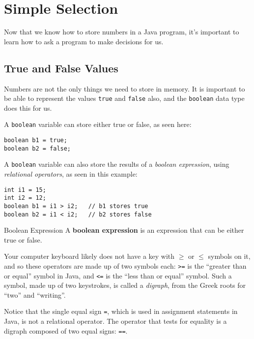 
\chapter{Simple Selection}
\label{chapter:if}

\minitoc

Now that we know how to store numbers in a Java program, it's important to learn how to ask a program to make decisions for us.

\section{True and False Values}
Numbers are not the only things we need to store in memory.  It is important to be able to represent the values \texttt{true} and \texttt{false} also, and the \texttt{boolean} data type does this for us.

A \texttt{boolean} variable can store either true or false, as seen here:

\begin{verbatim}
boolean b1 = true;
boolean b2 = false;
\end{verbatim}

A \texttt{boolean} variable can also store the results of a \textit{boolean expression}, using \textit{relational operators}, as seen in this example:

\begin{verbatim}
int i1 = 15;
int i2 = 12;
boolean b1 = i1 > i2;   // b1 stores true
boolean b2 = i1 < i2;   // b2 stores false
\end{verbatim}

\begin{defn}{Boolean Expression}
A \textbf{boolean expression} is an expression that can be either true or false.
\end{defn}

Your computer keyboard likely does not have a key with $\ge$ or $\le$ symbols on it, and so these operators are made up of two symbols each: \texttt{>=} is the ``greater than or equal'' symbol in Java, and \texttt{<=} is the ``less than or equal'' symbol.  Such a symbol, made up of two keystrokes, is called a \textit{digraph}, from the Greek roots for ``two'' and ``writing''.

Notice that the single equal sign \texttt{=}, which is used in assignment statements in Java, is not a relational operator.  The operator that tests for equality is a digraph composed of two equal signs: \texttt{==}.

